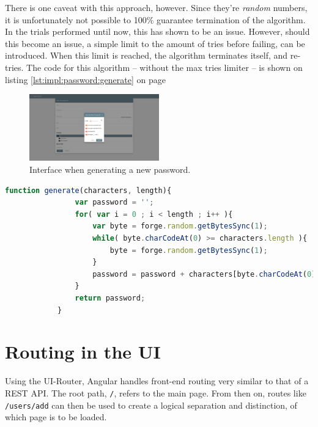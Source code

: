		There is one caveat with this approach, however. Since they're \emph{random} numbers, it is unfortunately not possible to 100\% guarantee termination of the algorithm. In the trials performed until now, this has shown to be an issue. However, should this become an issue, a simple limit to the amount of tries before failing, can be introduced. When this limit is reached, the algorithm terminates itself, and re-tries. The code for this algorithm -- without the max tries limiter -- is shown on listing \ref{lst:impl:password:generate} on page \pageref{lst:impl:password:generate}


		\begin{figure}[!htb]
			\centering
			\includegraphics[width=0.5\textwidth,clip,trim=750 250 750 250]{figures/implementation/screenshots/add-password.png}
			\caption{Interface when generating a new password.}
			\label{fig:impl:password:generate}
		\end{figure}

		\begin{lstlisting}[language=Javascript,gobble=12,caption={Generating the password, using the value cut-off method},label={lst:impl:password:generate}]
            function generate(characters, length){
                var password = '';
                for( var i = 0 ; i < length ; i++ ){
                    var byte = forge.random.getBytesSync(1);
                    while( byte.charCodeAt(0) >= characters.length ){
                        byte = forge.random.getBytesSync(1);					
                    }
                    password = password + characters[byte.charCodeAt(0)];
                } 
                return password;
            }	
		\end{lstlisting}

	\section{Routing in the UI}
		\label{sec:impl:ui-router}
		Using the UI-Router, Angular handles front-end routing very similar to that of a REST API. The root path, \verb=/=, refers to the main page. From then on, routes like \verb=/users/add= can then be used to create a logical separation and distinction, of which page is to be loaded.

